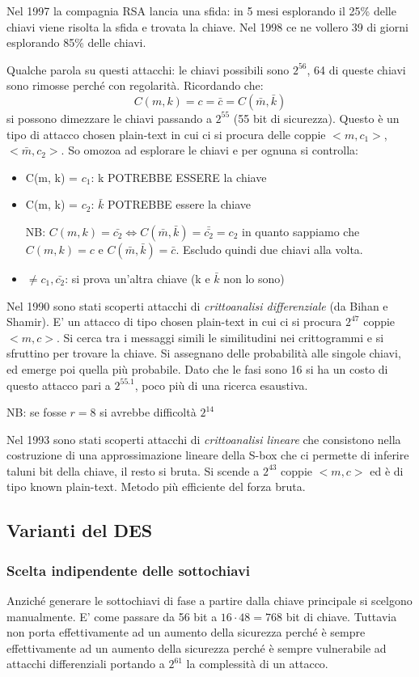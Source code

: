 Nel 1997 la compagnia RSA lancia una sfida: in 5 mesi esplorando il 25\% delle chiavi viene risolta la sfida e trovata la chiave.
Nel 1998 ce ne vollero 39 di giorni esplorando 85\% delle chiavi.

Qualche parola su questi attacchi: le chiavi possibili sono $2^{56}$, 64 di queste chiavi sono rimosse perché con regolarità. Ricordando che:
$$ C(m, k) = c = \bar{c} = C(\bar{m}, \bar{k}) $$
si possono dimezzare le chiavi passando a $2^{55}$ (55 bit di sicurezza). Questo è un tipo di attacco chosen plain-text in cui ci si procura delle coppie $<m, c_1>$, $<\bar{m}, c_2>$. So omozoa ad esplorare le chiavi e per ognuna si controlla:
\begin{itemize}
    \item C(m, k) = $c_1$: k POTREBBE ESSERE la chiave
    \item C(m, k) = $c_2$: $\bar{k}$ POTREBBE essere la chiave
    
    NB: $C(m,k) = \bar{c_2} \iff C(\bar{m},\bar{k}) = \bar{\bar{c_2}} = c_2$ in quanto sappiamo che $C(m, k) = c$ e $C(\bar{m}, \bar{k})=\bar{c}$. Escludo quindi due chiavi alla volta.
    \item $\neq c_1, \bar{c_2}$: si prova un'altra chiave (k e $\bar{k}$ non lo sono)
\end{itemize}

Nel 1990 sono stati scoperti attacchi di \emph{crittoanalisi differenziale} (da Bihan e Shamir). E' un attacco di tipo chosen plain-text in cui ci si procura $2^{47}$ coppie $<m,c>$.
Si cerca tra i messaggi simili le similitudini nei crittogrammi e si sfruttino per trovare la chiave.
Si assegnano delle probabilità alle singole chiavi, ed emerge poi quella più probabile.
Dato che le fasi sono 16 si ha un costo di questo attacco pari a $2^{55.1}$, poco più di una ricerca esaustiva.

NB: se fosse $r=8$ si avrebbe difficoltà $2^{14}$

Nel 1993 sono stati scoperti attacchi di \emph{crittoanalisi lineare} che consistono nella costruzione di una approssimazione lineare della S-box che ci permette di inferire taluni bit della chiave, il resto si bruta.
Si scende a $2^{43}$ coppie $<m, c>$ ed è di tipo known plain-text.
Metodo più efficiente del forza bruta.

\subsection{Varianti del DES}

\subsubsection{Scelta indipendente delle sottochiavi}
Anziché generare le sottochiavi di fase a partire dalla chiave principale si scelgono manualmente.
E' come passare da 56 bit a $16 \cdot 48 = 768$ bit di chiave.
Tuttavia non porta effettivamente ad un aumento della sicurezza perché è sempre effettivamente ad un aumento della sicurezza perché è sempre vulnerabile ad attacchi differenziali portando a $2^{61}$ la complessità di un attacco.

